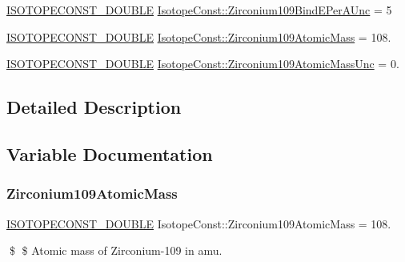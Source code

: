 \begin{DoxyCompactItemize}
\mbox{\hyperlink{group___isotope_const-_macros_ga8f45a7272ce02c0b4c65c44636ed719a}{I\+S\+O\+T\+O\+P\+E\+C\+O\+N\+S\+T\+\_\+\+D\+O\+U\+B\+LE}} \mbox{\hyperlink{group___isotope_const-_zirconium-_zr109_ga20b50135269bd1162f8f07e6dbb7c644}{Isotope\+Const\+::\+Zirconium109\+Bind\+E\+Per\+A\+Unc}} = 5
\item 
\mbox{\hyperlink{group___isotope_const-_macros_ga8f45a7272ce02c0b4c65c44636ed719a}{I\+S\+O\+T\+O\+P\+E\+C\+O\+N\+S\+T\+\_\+\+D\+O\+U\+B\+LE}} \mbox{\hyperlink{group___isotope_const-_zirconium-_zr109_ga72a1ebd4a221d199119011f8519d5fe0}{Isotope\+Const\+::\+Zirconium109\+Atomic\+Mass}} = 108.
\item 
\mbox{\hyperlink{group___isotope_const-_macros_ga8f45a7272ce02c0b4c65c44636ed719a}{I\+S\+O\+T\+O\+P\+E\+C\+O\+N\+S\+T\+\_\+\+D\+O\+U\+B\+LE}} \mbox{\hyperlink{group___isotope_const-_zirconium-_zr109_ga133e25135a0d9730d758b0b69272b777}{Isotope\+Const\+::\+Zirconium109\+Atomic\+Mass\+Unc}} = 0.
\end{DoxyCompactItemize}


\subsection{Detailed Description}


\subsection{Variable Documentation}
\mbox{\label{group___isotope_const-_zirconium-_zr109_ga72a1ebd4a221d199119011f8519d5fe0}} 
\subsubsection{\texorpdfstring{Zirconium109\+Atomic\+Mass}{Zirconium109AtomicMass}}
{\footnotesize\ttfamily \mbox{\hyperlink{group___isotope_const-_macros_ga8f45a7272ce02c0b4c65c44636ed719a}{I\+S\+O\+T\+O\+P\+E\+C\+O\+N\+S\+T\+\_\+\+D\+O\+U\+B\+LE}} Isotope\+Const\+::\+Zirconium109\+Atomic\+Mass = 108.}

\$ \$ Atomic mass of Zirconium-\/109 in amu. \mbox{\label{group___isotope_const-_zirconium-_zr109_ga133e25135a0d9730d758b0b69272b777}} 
